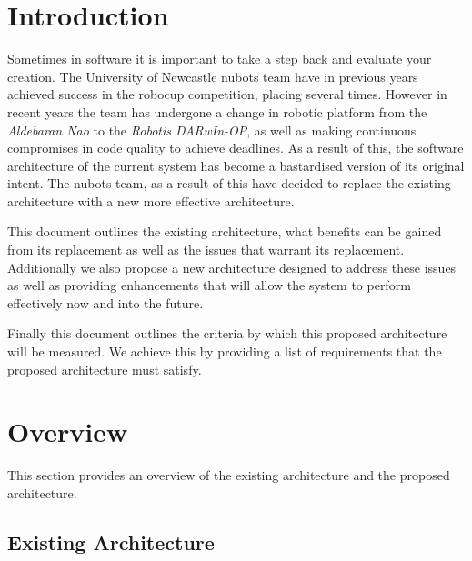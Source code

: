 \documentclass[english,12pt]{scrartcl}
\begin{document}
	\section{Introduction}
		Sometimes in software it is important to take a step back and evaluate your creation.
		The University of Newcastle \gls{nubots} team have in previous years achieved success in the \gls{robocup} competition, placing several times.
		However in recent years the team has undergone a change in robotic platform from the \emph{Aldebaran Nao} to the \emph{Robotis DARwIn-OP}, as well as making continuous compromises in code quality to achieve deadlines.
		As a result of this, the software architecture of the current system has become a bastardised version of its original intent.
		The \gls{nubots} team, as a result of this have decided to replace the existing architecture with a new more effective architecture.
		
		This document outlines the existing architecture, what benefits can be gained from its replacement as well as the issues that warrant its replacement.
		Additionally we also propose a new architecture designed to address these issues as well as providing enhancements that will allow the system to perform effectively now and into the future.
		
		Finally this document outlines the criteria by which this proposed architecture will be measured. 
		We achieve this by providing a list of requirements that the proposed architecture must satisfy.

	\section{Overview}
		This section provides an overview of the existing architecture and the proposed architecture.

		\subsection{Existing Architecture}

\end{document}

